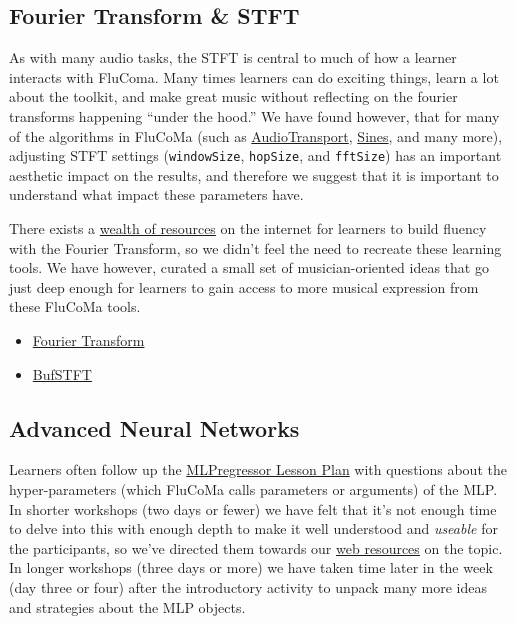 \documentclass{article}
\providecommand{\tightlist}{%
  \setlength{\itemsep}{0pt}\setlength{\parskip}{0pt}}
\begin{document}
\subsection{Fourier Transform \& STFT}\label{fourier-transform-stft}

As with many audio tasks, the STFT is central to much of how a learner
interacts with FluComa. Many times learners can do exciting things,
learn a lot about the toolkit, and make great music without reflecting
on the fourier transforms happening ``under the hood.'' We have found
however, that for many of the algorithms in FluCoMa (such as
\href{https://learn.flucoma.org/reference/audiotransport/}{AudioTransport},
\href{https://learn.flucoma.org/reference/sines/}{Sines}, and many
more), adjusting STFT settings (\texttt{windowSize}, \texttt{hopSize},
and \texttt{fftSize}) has an important aesthetic impact on the results,
and therefore we suggest that it is important to understand what impact
these parameters have.

There exists a
\href{https://learn.flucoma.org/learn/fourier-transform/#related-resources}{wealth
of resources} on the internet for learners to build fluency with the
Fourier Transform, so we didn't feel the need to recreate these
learning tools. We have however, curated a small set of musician-oriented ideas that go just deep enough for learners to gain access to more musical expression from these FluCoMa tools.

\begin{itemize}
\tightlist
\item
  \href{https://learn.flucoma.org/learn/fourier-transform/}{Fourier
  Transform}
\item
  \href{https://learn.flucoma.org/reference/bufstft/}{BufSTFT}
\end{itemize}

\subsection{Advanced Neural Networks}\label{advanced-neural-networks}

Learners often follow up the \hyperref[example-lesson-plan]{MLPregressor Lesson Plan} with questions about the hyper-parameters (which FluCoMa calls
parameters or arguments) of the MLP. In shorter workshops (two days or
fewer) we have felt that it's not enough time to delve into this with
enough depth to make it well understood and \emph{useable} for the
participants, so we've directed them towards our
\href{https://learn.flucoma.org/learn/mlp-parameters/}{web resources} on
the topic. In longer workshops (three days or more) we have taken time
later in the week (day three or four) after the introductory activity to
unpack many more ideas and strategies about the MLP objects.
\end{document}
